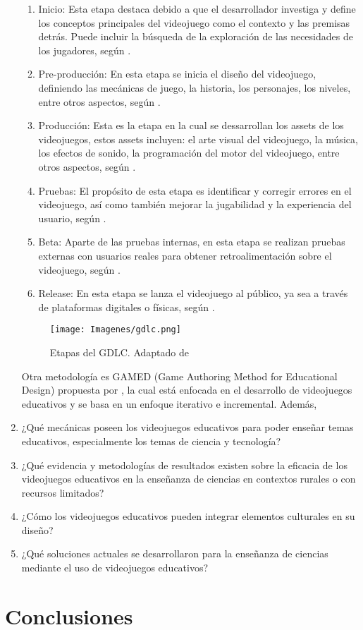 \begin{enumerate}
    \begin{enumerate}
        \item Inicio: Esta etapa destaca debido a que el desarrollador investiga y define los conceptos principales del videojuego como el contexto y las premisas detrás. Puede incluir la búsqueda de la exploración de las necesidades de los jugadores, según \cite{}.
        \item Pre-producción: En esta etapa se inicia el diseño del videojuego, definiendo las mecánicas de juego, la historia, los personajes, los niveles, entre otros aspectos, según \cite{}.
        \item Producción: Esta es la etapa en la cual se dessarrollan los assets de los videojuegos, estos assets incluyen: el arte visual del videojuego, la música, los efectos de sonido, la programación del motor del videojuego, entre otros aspectos, según \cite{}.
        \item Pruebas: El propósito de esta etapa es identificar y corregir errores en el videojuego, así como también mejorar la jugabilidad y la experiencia del usuario, según \cite{}.
        \item Beta: Aparte de las pruebas internas, en esta etapa se realizan pruebas externas con usuarios reales para obtener retroalimentación sobre el videojuego, según \cite{}.
        \item Release: En esta etapa se lanza el videojuego al público, ya sea a través de plataformas digitales o físicas, según \cite{}.
    \end{enumerate}

    \begin{figure}
        \centering
        \texttt{[image: Imagenes/gdlc.png]}
        \caption{Etapas del GDLC. Adaptado de \cite{}}
        \label{fig:gdlc_stages}
    \end{figure}
    
    Otra metodología es GAMED (Game Authoring Method for Educational Design) propuesta por \cite{}, la cual está enfocada en el desarrollo de videojuegos educativos y se basa en un enfoque iterativo e incremental. Además,
    
    \item ¿Qué mecánicas poseen los videojuegos educativos para poder enseñar temas educativos, especialmente los temas de ciencia y tecnología?
    \item ¿Qué evidencia y metodologías de resultados existen sobre la eficacia de los videojuegos educativos en la enseñanza de ciencias en contextos rurales o con recursos limitados?
    \item ¿Cómo los videojuegos educativos pueden integrar elementos culturales en su diseño?
    \item ¿Qué soluciones actuales se desarrollaron para la enseñanza de ciencias mediante el uso de videojuegos educativos?
\end{enumerate}

\section{Conclusiones}